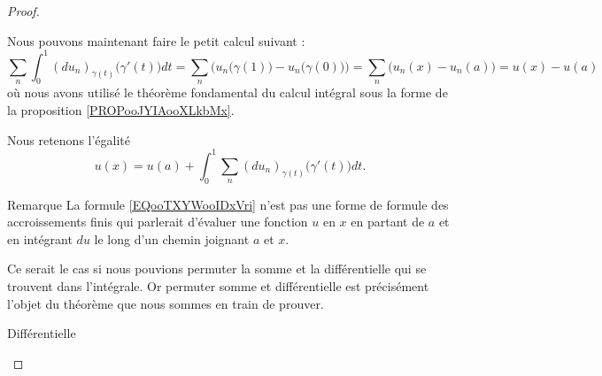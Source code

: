 \begin{proof}
\begin{subproof}
		Nous pouvons maintenant faire le petit calcul suivant :
		\begin{equation}
			\sum_n\int_0^1(du_n)_{\gamma(t)}\big( \gamma'(t) \big)dt=\sum_n\Big( u_n\big( \gamma(1) \big)-u_n\big( \gamma(0) \big) \Big)=\sum_n\big( u_n(x)-u_n(a) \big)=u(x)-u(a)
		\end{equation}
		où nous avons utilisé le théorème fondamental du calcul intégral sous la forme de la proposition \ref{PROPooJYIAooXLkbMx}.

		Nous retenons l'égalité
		\begin{equation}        \label{EQooTXYWooIDxVri}
			u(x)=u(a)+\int_0^1\sum_n(du_n)_{\gamma(t)}\big( \gamma'(t) \big)dt.
		\end{equation}
		\item[Remarque]
		La formule \eqref{EQooTXYWooIDxVri} n'est pas une forme de formule des accroissements finis qui parlerait d'évaluer une fonction \( u\) en \( x\) en partant de \( a\) et en intégrant \( du\) le long d'un chemin joignant \( a\) et \( x\).

		Ce serait le cas si nous pouvions permuter la somme et la différentielle qui se trouvent dans l'intégrale. Or permuter somme et différentielle est précisément l'objet du théorème que nous sommes en train de prouver.

		\item[Différentielle]


\end{subproof}
\end{proof}
